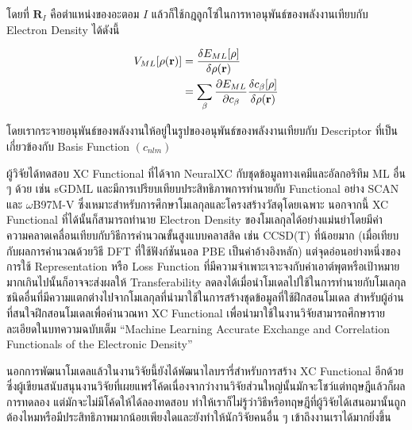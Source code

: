 \noindent โดยที่ $\bm{R}_{I}$ คือตำแหน่งของอะตอม $I$ แล้วก็ใช้กฎลูกโซ่ในการหาอนุพันธ์ของพลังงานเทียบกับ Electron Density
ได้ดังนี้

\begin{align}
    {V}_{{{M}}L}[\rho ({\bf{r}})] & = \frac{\delta {E}_{{{M}}L}[\rho ]}{\delta \rho ({\bf{r}})} \nonumber \\
                                  & = \sum_{\beta} \frac{\partial {E}_{{{M}}L}}{\partial {c}_{\beta }}
    \frac{\delta {c}_{\beta }[\rho ]}{\delta \rho ({\bf{r}})}
\end{align}

\noindent โดยเรากระจายอนุพันธ์ของพลังงานให้อยู่ในรูปของอนุพันธ์ของพลังงานเทียบกับ Descriptor ที่เป็นเกี่ยวข้องกับ Basis Function
$(c_{nlm})$

ผู้วิจัยได้ทดสอบ XC Functional ที่ได้จาก NeuralXC กับชุดข้อมูลทางเคมีและอัลกอริทึม ML อื่น ๆ ด้วย เช่น sGDML และมีการเปรียบเทียบประสิทธิภาพการทำนายกับ Functional อย่าง SCAN และ $\omega$B97M-V ซึ่งเหมาะสำหรับการศึกษาโมเลกุลและโครงสร้างวัสดุโดยเฉพาะ นอกจากนี้ XC Functional ที่ได้นั้นก็สามารถทำนาย Electron Density ของโมเลกุลได้อย่างแม่นยำโดยมีค่าความคลาดเคลื่อนเทียบกับวิธีการคำนวณขั้นสูงแบบคลาสสิค เช่น CCSD(T) ที่น้อยมาก (เมื่อเทียบกับผลการคำนวณด้วยวิธี DFT ที่ใช้ฟังก์ชันนอล PBE เป็นค่าอ้างอิงหลัก) แต่จุดอ่อนอย่างหนึ่งของการใช้ Representation หรือ Loss Function ที่มีความจำเพาะเจาะจงกับค่าเอาต์พุตหรือเป้าหมายมากเกินไปนั้นก็อาจจะส่งผลให้ Transferability ลดลงได้เมื่อนำโมเดลไปใช้ในการทำนายกับโมเลกุลชนิดอื่นที่มีความแตกต่างไปจากโมเลกุลที่นำมาใช้ในการสร้างชุดข้อมูลที่ใช้ฝึกสอนโมเดล สำหรับผู้อ่านที่สนใจฝึกสอนโมเดลเพื่อคำนวณหา XC Functional เพื่อนำมาใช้ในงานวิจัยสามารถศึกษารายละเอียดในบทความฉบับเต็ม \enquote{Machine Learning Accurate Exchange and Correlation Functionals of the Electronic Density}

นอกการพัฒนาโมเดลแล้วในงานวิจัยนี้ยังได้พัฒนาไลบรารี่สำหรับการสร้าง XC Functional อีกด้วยซึ่งผู้เขียนสนับสนุนงานวิจัยที่เผยแพร่โค้ดเนื่องจากว่างานวิจัยส่วนใหญ่นั้นมักจะโชว์แต่ทฤษฎีแล้วก็ผลการทดลอง แต่มักจะไม่มีโค้ดให้ได้ลองทดสอบ ทำให้เราก็ไม่รู้ว่าวิธีหรือทฤษฎีที่ผู้วิจัยได้เสนอมานั้นถูกต้องไหมหรือมีประสิทธิภาพมากน้อยเพียงใดและยังทำให้นักวิจัยคนอื่น ๆ เข้าถึงงานเราได้มากยิ่งขึ้น

